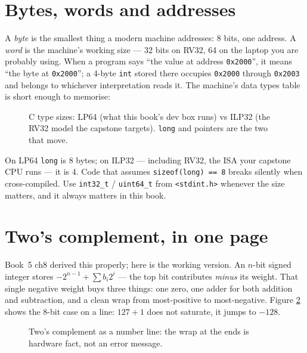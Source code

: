 \section{Bytes, words and addresses}
\label{sec:bytes02}

A \emph{byte} is the smallest thing a modern machine addresses: 8 bits,
one address. A \emph{word} is the machine's working size --- 32 bits on
RV32, 64 on the laptop you are probably using. When a program says
``the value at address \texttt{0x2000}'', it means ``the byte at
\texttt{0x2000}''; a 4-byte \texttt{int} stored there occupies
\texttt{0x2000} through \texttt{0x2003} and belongs to whichever
interpretation reads it. The machine's data types table is short enough
to memorise:

\begin{figure}[htbp]
\centering

\caption{C type sizes: LP64 (what this book's dev box runs) vs ILP32
(the RV32 model the capstone targets). \texttt{long} and pointers are
the two that move.}
\label{fig:typetable02}
\end{figure}

\begin{tripwire}
On LP64 \texttt{long} is 8 bytes; on ILP32 --- including RV32, the ISA
your capstone CPU runs --- it is 4. Code that assumes \texttt{sizeof(long)
== 8} breaks silently when cross-compiled. Use \texttt{int32\_t} /
\texttt{uint64\_t} from \texttt{<stdint.h>} whenever the size matters,
and it always matters in this book.
\end{tripwire}

\section{Two's complement, in one page}
\label{sec:twos02}

Book~5 ch8 derived this properly; here is the working version. An
$n$-bit signed integer stores $-2^{n-1} + \sum b_i 2^i$ --- the top bit
contributes \emph{minus} its weight. That single negative weight buys
three things: one zero, one adder for both addition and subtraction,
and a clean wrap from most-positive to most-negative. Figure
\ref{fig:twos02} shows the 8-bit case on a line: $127 + 1$ does not
saturate, it jumps to $-128$.

\begin{figure}[htbp]
\centering

\caption{Two's complement as a number line: the wrap at the ends is
hardware fact, not an error message.}
\label{fig:twos02}
\end{figure}

